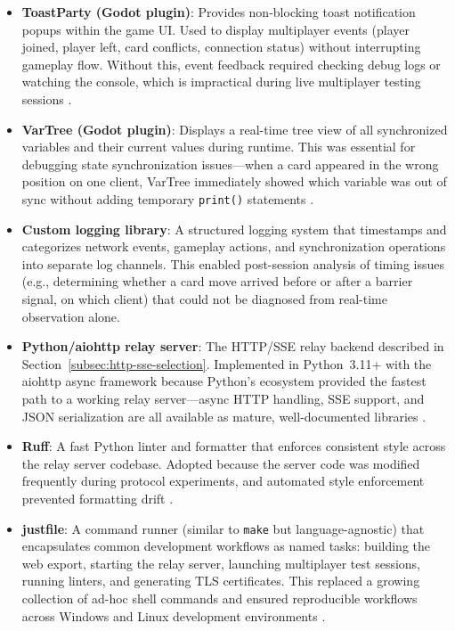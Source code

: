 \begin{itemize}
    \item \textbf{ToastParty (Godot plugin)}: Provides non-blocking toast notification popups within the game UI. Used to display multiplayer events (player joined, player left, card conflicts, connection status) without interrupting gameplay flow. Without this, event feedback required checking debug logs or watching the console, which is impractical during live multiplayer testing sessions \citep{toastparty_asset}.

    \item \textbf{VarTree (Godot plugin)}: Displays a real-time tree view of all synchronized variables and their current values during runtime. This was essential for debugging state synchronization issues---when a card appeared in the wrong position on one client, VarTree immediately showed which variable was out of sync without adding temporary \texttt{print()} statements \citep{vartree_asset}.

    \item \textbf{Custom logging library}: A structured logging system that timestamps and categorizes network events, gameplay actions, and synchronization operations into separate log channels. This enabled post-session analysis of timing issues (e.g., determining whether a card move arrived before or after a barrier signal, on which client) that could not be diagnosed from real-time observation alone.

    \item \textbf{Python/aiohttp relay server}: The HTTP/SSE relay backend described in Section~\ref{subsec:http-sse-selection}. Implemented in Python~3.11+ with the aiohttp async framework because Python's ecosystem provided the fastest path to a working relay server---async HTTP handling, SSE support, and JSON serialization are all available as mature, well-documented libraries \citep{python_org,aiohttp_docs}.

    \item \textbf{Ruff}: A fast Python linter and formatter that enforces consistent style across the relay server codebase. Adopted because the server code was modified frequently during protocol experiments, and automated style enforcement prevented formatting drift \citep{ruff_docs}.

    \item \textbf{justfile}: A command runner (similar to \texttt{make} but language-agnostic) that encapsulates common development workflows as named tasks: building the web export, starting the relay server, launching multiplayer test sessions, running linters, and generating TLS certificates. This replaced a growing collection of ad-hoc shell commands and ensured reproducible workflows across Windows and Linux development environments \citep{just_docs}.


\end{itemize}
